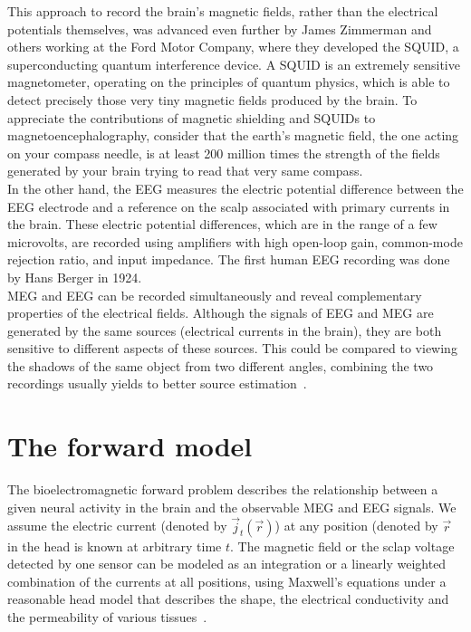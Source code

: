This approach to record the brain's magnetic fields, rather than the electrical potentials themselves, was advanced even further by James Zimmerman and others working at the Ford Motor Company, where they developed the SQUID, a superconducting quantum interference device. A SQUID is an extremely sensitive magnetometer, operating on the principles of quantum physics, which is able to detect precisely those very tiny magnetic fields produced by the brain. To appreciate the contributions of magnetic shielding and SQUIDs to magnetoencephalography, consider that the earth's magnetic field, the one acting on your compass needle, is at least 200 million times the strength of the fields generated by your brain trying to read that very same compass.\\

In the other hand, the EEG measures the electric potential difference between the EEG electrode and a reference on the scalp associated with primary currents in the brain. These electric potential differences, which are in the range of a few microvolts, are recorded using amplifiers with high open-loop gain, common-mode rejection ratio, and input impedance. The first human EEG recording was done by Hans Berger in 1924.\\

MEG and EEG can be recorded simultaneously and reveal complementary properties of the electrical fields. Although the signals of EEG and MEG are generated by the same sources (electrical currents in the brain), they are both sensitive to different aspects of these sources. This could be compared to viewing the shadows of the same object from two different angles, combining the two recordings usually yields to better source estimation~\cite{malmivuo2012comparison,sharon2007advantage,aydin2015combined}.

\section{The forward model}
The bioelectromagnetic forward problem describes the relationship between a given neural activity in the brain and the observable MEG and EEG signals. We assume the electric current (denoted by $\vec{j}_t(\vec{r})$) at any position (denoted by $\vec{r}$ in the head is known at arbitrary time $t$. The magnetic field or the sclap voltage detected by one sensor can be modeled as an integration or a linearly weighted combination of the currents at all positions, using Maxwell's equations under a reasonable head model that describes the shape, the electrical conductivity and the permeability of various tissues~\cite{hamalainen1993magnetoencephalography,mosher1999eeg}.

